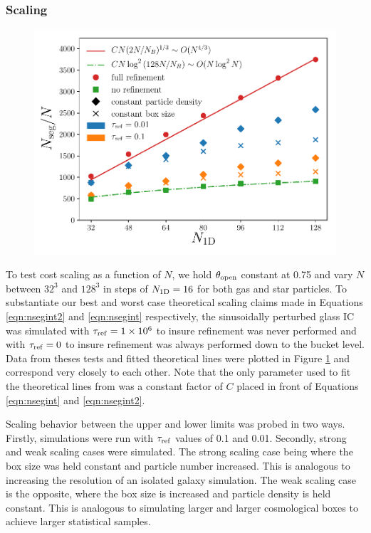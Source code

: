 \documentclass[fleq,usenatbib]{mnras}
\providecommand{\e}[1]{\ensuremath{\times10^{#1}}}
\newcommand{\tr}{\tau_{\rm ref}}
\newcommand{\tO}{\theta_{\rm open}}
\begin{document}
\subsubsection{Scaling}
\begin{figure}
\includegraphics[width=1\linewidth]{Figures/particle_scaling.pdf}
\caption{}
\label{fig:pscale}
\end{figure}
To test cost scaling as a function of $N$, we hold $\tO$ constant at 0.75 and
vary $N$ between $32^3$ and $128^3$ in steps of $N_{\rm 1D} = 16$ for both gas 
and star particles. To substantiate our best and worst case theoretical 
scaling claims made in Equations \ref{eqn:nsegint2} and \ref{eqn:nsegint} 
respectively, the sinusoidally perturbed glass IC was simulated with $\tr=1\e 6$ 
to insure refinement was never performed and with $\tr=0$ to insure refinement 
was always performed down to the bucket level. Data from theses tests and 
fitted theoretical lines were plotted in Figure \ref{fig:pscale} and 
correspond very closely to each other. Note that the only parameter used to 
fit the theoretical lines from was a constant factor of $C$ placed in front of 
Equations \ref{eqn:nsegint} and \ref{eqn:nsegint2}.

Scaling behavior between the upper and lower limits was probed in two ways. 
Firstly, simulations were run with $\tr$ values of 0.1 and 0.01. Secondly, 
strong and weak scaling cases were simulated. The strong scaling case being 
where the box size was held constant and particle number increased. This is 
analogous to increasing the resolution of an isolated galaxy simulation. The 
weak scaling case is the opposite, where the box size is increased and 
particle density is held constant. This is analogous to simulating larger and 
larger cosmological boxes to achieve larger statistical samples. 
\end{document}
